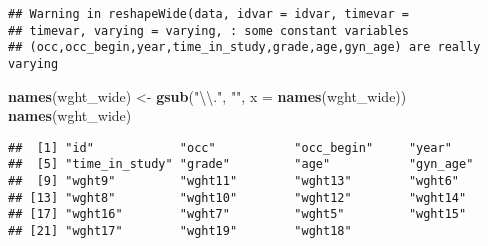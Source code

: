 \documentclass[]{article}
\newenvironment{Shaded}{\begin{snugshade}}{\end{snugshade}}
\newcommand{\CharTok}[1]{\textcolor[rgb]{0.31,0.60,0.02}{#1}}
\newcommand{\DataTypeTok}[1]{\textcolor[rgb]{0.13,0.29,0.53}{#1}}
\newcommand{\KeywordTok}[1]{\textcolor[rgb]{0.13,0.29,0.53}{\textbf{#1}}}
\newcommand{\NormalTok}[1]{#1}
\newcommand{\OperatorTok}[1]{\textcolor[rgb]{0.81,0.36,0.00}{\textbf{#1}}}
\newcommand{\StringTok}[1]{\textcolor[rgb]{0.31,0.60,0.02}{#1}}
\begin{document}
\begin{verbatim}
## Warning in reshapeWide(data, idvar = idvar, timevar =
## timevar, varying = varying, : some constant variables
## (occ,occ_begin,year,time_in_study,grade,age,gyn_age) are really varying
\end{verbatim}

\begin{Shaded}
\begin{Highlighting}[]
\KeywordTok{names}\NormalTok{(wght_wide) <-}\StringTok{ }\KeywordTok{gsub}\NormalTok{(}\StringTok{"}\CharTok{\textbackslash{}\textbackslash{}}\StringTok{."}\NormalTok{, }\StringTok{""}\NormalTok{, }\DataTypeTok{x =} \KeywordTok{names}\NormalTok{(wght_wide))}
\KeywordTok{names}\NormalTok{(wght_wide)}
\end{Highlighting}
\end{Shaded}

\begin{verbatim}
##  [1] "id"            "occ"           "occ_begin"     "year"         
##  [5] "time_in_study" "grade"         "age"           "gyn_age"      
##  [9] "wght9"         "wght11"        "wght13"        "wght6"        
## [13] "wght8"         "wght10"        "wght12"        "wght14"       
## [17] "wght16"        "wght7"         "wght5"         "wght15"       
## [21] "wght17"        "wght19"        "wght18"
\end{verbatim}

\begin{Shaded}
\end{Shaded}
\end{document}
